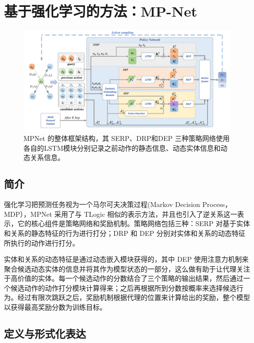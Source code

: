 \documentclass[a4paper, AutoFakeBold]{article}
\begin{document}
\section{基于强化学习的方法：MP-Net}





\begin{figure}
	\captionsetup{width=0.85\textwidth}
	\centering
	\includegraphics[width=1.0\textwidth]{figures/MPNet.png}
	\caption{MPNet 的整体框架结构，其 SERP、DRP和DEP 三种策略网络使用各自的LSTM模块分别记录之前动作的静态信息、动态实体信息和动态关系信息\cite{4-2024}。}
\end{figure}



\subsection{简介}

强化学习把预测任务视为一个马尔可夫决策过程(Markov Decision Process，MDP），MPNet 采用了与 TLogic 相似的表示方法，并且也引入了逆关系这一表示，它的核心组件是策略网络和奖励机制。策略网络包括三种：SERP 对基于实体和关系的静态特征的行为进行打分；DRP 和 DEP 分别对实体和关系的动态特征所执行的动作进行打分。

实体和关系的动态特征是通过动态嵌入模块获得的，其中 DEP 使用注意力机制来聚合候选动态实体的信息并将其作为模型状态的一部分，这么做有助于让代理关注于高价值的实体。每一个候选动作的分数结合了三个策略的输出结果，然后通过一个候选动作的动作打分模块计算得来；之后再根据所到分数按概率来选择候选行为。经过有限次跳跃之后，奖励机制根据代理的位置来计算给出的奖励，整个模型以获得最高奖励分数为训练目标。


\subsection{定义与形式化表达}
\end{document}
